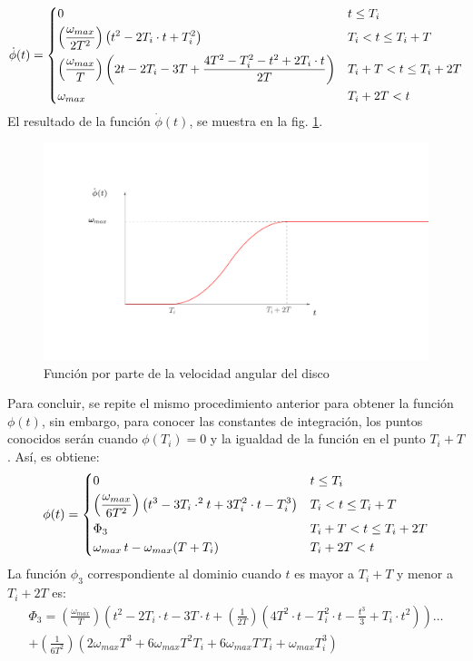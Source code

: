 \[ \dot{\phi}(t) =
\begin{dcases}
	0																												&	t \leq T_i \\
	\left(\frac{\omega_{max}}{2T^2}\right)\left(t^2 - 2T_i\cdot t + T_i^2\right)									&	T_i < t \leq T_i + T\\
	\left(\frac{\omega_{max}}{T}\right)\left(2t - 2T_i - 3T + \frac{4T^2 - T_i^2 - t^2 + 2T_i\cdot t}{2T}\right)	&	T_i + T < t \leq T_i + 2T\\
	\omega_{max}																									&	T_i + 2T < t\\
\end{dcases} 
\]
El resultado de la función $\dot{\phi}(t)$, se muestra en la fig. \ref{fig:anglep}.
\begin{figure}[h]
\centering
\includegraphics[width=0.85\linewidth, trim={7cm 5cm 15cm 6cm},clip]{Imagenes/anglep_function.pdf}
\caption{Función por parte de la velocidad angular del disco}
\label{fig:anglep}
\end{figure}

Para concluir, se repite el mismo procedimiento anterior para obtener la función $\phi (t)$, sin embargo, para conocer las constantes de integración, los puntos conocidos serán cuando $\phi(T_i) = 0$ y la igualdad de la función en el punto $T_i + T$. Así, es obtiene:
\[ \phi (t) =
\begin{dcases}
	0																									&	t \leq T_i \\
	\left(\frac{\omega_{max}}{6T^2}\right)\left(t^3 - 3T_i\cdot^2 t + 3T_i^2\cdot t - T_i^3\right)		&	T_i < t \leq T_i + T\\
	\Phi_3																								&	T_i + T < t \leq T_i + 2T\\
	\omega_{max}\, t - \omega_{max}(T + T_i)															&	T_i + 2T < t\\
\end{dcases} 
\]
La función $\phi_3$ correspondiente al dominio cuando $t$ es mayor a $T_i + T$ y menor a $T_i  + 2T$ es:
\begin{multline*}
\Phi_3 = \left(\frac{\omega_{max}}{T}\right)\left(t^2 - 2T_i\cdot t - 3T\cdot t + \left(\frac{1}{2T}\right)\left(4T^2\cdot t - T_i^2\cdot t - \frac{t^3}{3} + T_i\cdot t^2\right)\right)\dots \\
 + \left(\frac{1}{6T^2}\right) \left(2\omega_{max}T^3 + 6\omega_{max}T^2T_i + 6\omega_{max}T\,T_i + \omega_{max}T_i^3\right)
\end{multline*}

